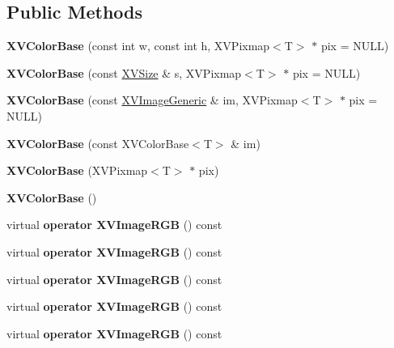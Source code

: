 \subsection*{Public Methods}
\begin{CompactItemize}
\item 
{\bf XVColor\-Base} (const int w, const int h, XVPixmap$<$T$>$ $\ast$ pix = NULL)
\item 
{\bf XVColor\-Base} (const \hyperlink{class_XVSize}{XVSize} \& s, XVPixmap$<$T$>$ $\ast$ pix = NULL)
\item 
{\bf XVColor\-Base} (const \hyperlink{class_XVImageGeneric}{XVImage\-Generic} \& im, XVPixmap$<$T$>$ $\ast$ pix = NULL)
\item 
{\bf XVColor\-Base} (const XVColor\-Base$<$T$>$ \& im)
\item 
{\bf XVColor\-Base} (XVPixmap$<$T$>$ $\ast$ pix)
\item 
{\bf XVColor\-Base} ()
\item 
\label{XVColorBase_a6}
\hypertarget{class_XVColorBase_a6}{
virtual {\bf operator XVImage\-RGB} () const}

\item 
\label{XVColorBase_a7}
\hypertarget{class_XVColorBase_a7}{
virtual {\bf operator XVImage\-RGB} () const}

\item 
\label{XVColorBase_a8}
\hypertarget{class_XVColorBase_a8}{
virtual {\bf operator XVImage\-RGB} () const}

\item 
\label{XVColorBase_a9}
\hypertarget{class_XVColorBase_a9}{
virtual {\bf operator XVImage\-RGB} () const}

\item 
\label{XVColorBase_a10}
\hypertarget{class_XVColorBase_a10}{
virtual {\bf operator XVImage\-RGB} () const}


\end{CompactItemize}
